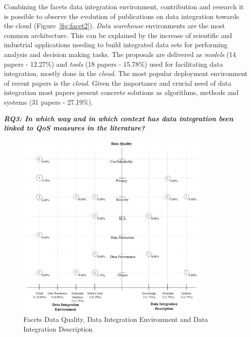 Combining the facets data integration environment, contribution
and research it is possible to observe  the evolution of publications on data integration towards the cloud (Figure~\ref{fig:facet2}).  {\em Data warehouse} environments are the most common architecture. This can be explained by the increase of scientific  and industrial applications needing to build integrated  data sets for performing analysis and decision making tasks. The proposals are delivered as {\em models}  (14  papers - 12.27\%)  and {\em tools} (18
papers - 15.78\%)  used for facilitating data integration, mostly done in the {\em cloud}.  The most popular deployment environment of recent papers is the {\em cloud}. Given the importance and crucial need of data integration  most papers present concrete solutions as algorithms, methods and systems (31 papers - 27.19\%).
  
\textbf{\textit{RQ3:  In which way and in which context has data integration been linked to QoS measures in the literature?}}
\begin{figure}[!h]
\centering
\includegraphics[width=0.85\textwidth]{figs/bubble-charts/Data-Quality-DI.pdf}
\caption{Facets Data Quality, Data Integration Environment and Data Integration Description}\label{fig:facet4}
\end{figure}

